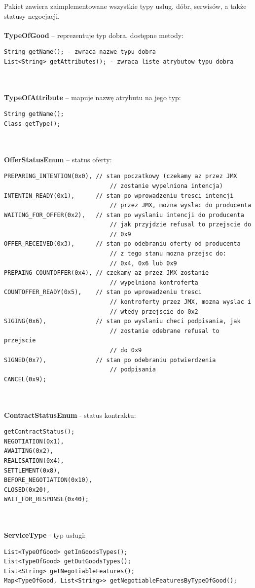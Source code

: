 \documentclass[a4paper,12pt]{article}
\begin{document}
Pakiet zawiera zaimplementowane wszystkie typy usług, dóbr, serwisów, a także statusy negocjacji.
\\ \\
\textbf{TypeOfGood} – reprezentuje typ dobra, dostępne metody:
\begin{lstlisting}
String getName(); - zwraca nazwe typu dobra
List<String> getAttributes(); - zwraca liste atrybutow typu dobra
\end{lstlisting}
\\ \\
\textbf{TypeOfAttribute} – mapuje nazwę atrybutu na jego typ:
\begin{lstlisting}
String getName();
Class getType();
\end{lstlisting}
\\ \\
\textbf{OfferStatusEnum} – status oferty:
\begin{lstlisting}
PREPARING_INTENTION(0x0), // stan poczatkowy (czekamy az przez JMX
                              // zostanie wypelniona intencja)
INTENTIN_READY(0x1),      // stan po wprowadzeniu tresci intencji
                              // przez JMX, mozna wyslac do producenta
WAITING_FOR_OFFER(0x2),   // stan po wyslaniu intencji do producenta
                              // jak przyjdzie refusal to przejscie do
                              // 0x9
OFFER_RECEIVED(0x3),      // stan po odebraniu oferty od producenta
                              // z tego stanu mozna przejsc do:
                              // 0x4, 0x6 lub 0x9
PREPAING_COUNTOFFER(0x4), // czekamy az przez JMX zostanie
                              // wypelniona kontroferta
COUNTOFFER_READY(0x5),    // stan po wprowadzeniu tresci
                              // kontroferty przez JMX, mozna wyslac i
                              // wtedy przejscie do 0x2
SIGING(0x6),              // stan po wyslaniu checi podpisania, jak
                              // zostanie odebrane refusal to przejscie
                              // do 0x9
SIGNED(0x7),              // stan po odebraniu potwierdzenia
                              // podpisania
CANCEL(0x9);
\end{lstlisting}
\\ \\
\textbf{ContractStatusEnum} - status kontraktu: 
\begin{lstlisting}
getContractStatus();
NEGOTIATION(0x1),
AWAITING(0x2),
REALISATION(0x4),
SETTLEMENT(0x8),
BEFORE_NEGOTIATION(0x10),
CLOSED(0x20),
WAIT_FOR_RESPONSE(0x40);
\end{lstlisting}
\\ \\
\textbf{ServiceType} - typ usługi:
\begin{lstlisting}
List<TypeOfGood> getInGoodsTypes();
List<TypeOfGood> getOutGoodsTypes();
List<String> getNegotiableFeatures();
Map<TypeOfGood, List<String>> getNegotiableFeaturesByTypeOfGood();
\end{lstlisting}
\\ \\
\end{document}
